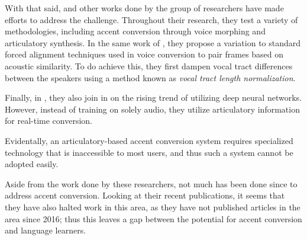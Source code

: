 \documentclass
[
    a4paper,
    twoside,
    12pt
]
{report}
\begin{document}
With that said, \cite{aryal2014} and other works done by the group of
researchers have made efforts to address the challenge. Throughout their
research, they test a variety of methodologies, including accent
conversion through voice morphing and articulatory synthesis. In the
same work of \cite{aryal2014}, they propose a variation to standard
forced alignment techniques used in voice conversion to pair frames
based on acoustic similarity. To do achieve this, they first dampen
vocal tract differences between the speakers using a method known as
\emph{vocal tract length normalization}.

Finally, in \cite{aryal2015}, they also join in on the rising trend of
utilizing deep neural networks. However, instead of training on solely
audio, they utilize articulatory information for real-time conversion.

Evidentally, an articulatory-based accent conversion system requires
specialized technology that is inaccessible to most users, and thus such
a system cannot be adopted easily.

Aside from the work done by these researchers, not much has been done
since to address accent conversion. Looking at their recent
publications, it seems that they have also halted work in this area, as
they have not published articles in the area since 2016; thus this
leaves a gap between the potential for accent conversion and language
learners.
\cleardoublepage
% 
% 

\printbibliography
\end{document}
